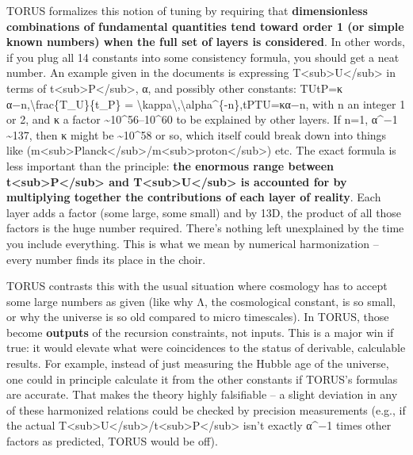 TORUS formalizes this notion of tuning by requiring that
\textbf{dimensionless combinations of fundamental quantities tend toward
order 1 (or simple known numbers) when the full set of layers is
considered}​. In other words, if you plug all 14 constants into some
consistency formula, you should get a neat number. An example given in
the documents is expressing
T\textless{}sub\textgreater{}U\textless{}/sub\textgreater{} in terms of
t\textless{}sub\textgreater{}P\textless{}/sub\textgreater{}, α, and
possibly other constants:
TUtP=κ α−n,\textbackslash{}frac\{T\_U\}\{t\_P\} =
\textbackslash{}kappa\textbackslash{},\textbackslash{}alpha\^{}\{-n\},tP​TU​​=κα−n,
with n an integer 1 or 2, and κ a factor
\textasciitilde{}10\^{}56--10\^{}60 to be explained by other layers​. If
n=1, α\^{}−1 \textasciitilde{}137, then κ might be
\textasciitilde{}10\^{}58 or so, which itself could break down into
things like
(m\textless{}sub\textgreater{}Planck\textless{}/sub\textgreater{}/m\textless{}sub\textgreater{}proton\textless{}/sub\textgreater{})
etc. The exact formula is less important than the principle: \textbf{the
enormous range between
t\textless{}sub\textgreater{}P\textless{}/sub\textgreater{} and
T\textless{}sub\textgreater{}U\textless{}/sub\textgreater{} is accounted
for by multiplying together the contributions of each layer of
reality}​. Each layer adds a factor (some large, some small) and by 13D,
the product of all those factors is the huge number required. There's
nothing left unexplained by the time you include everything. This is
what we mean by numerical harmonization -- every number finds its place
in the choir.

TORUS contrasts this with the usual situation where cosmology has to
accept some large numbers as given (like why Λ, the cosmological
constant, is so small, or why the universe is so old compared to micro
timescales). In TORUS, those become \textbf{outputs} of the recursion
constraints, not inputs​. This is a major win if true: it would elevate
what were coincidences to the status of derivable, calculable results​.
For example, instead of just measuring the Hubble age of the universe,
one could in principle calculate it from the other constants if TORUS's
formulas are accurate. That makes the theory highly falsifiable -- a
slight deviation in any of these harmonized relations could be checked
by precision measurements (e.g., if the actual
T\textless{}sub\textgreater{}U\textless{}/sub\textgreater{}/t\textless{}sub\textgreater{}P\textless{}/sub\textgreater{}
isn't exactly α\^{}−1 times other factors as predicted, TORUS would be
off).

